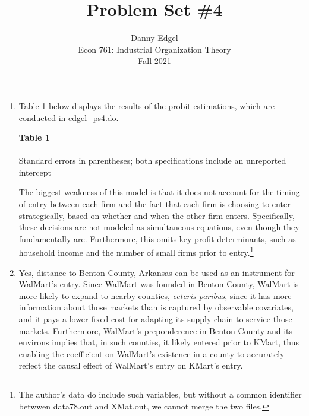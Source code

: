\documentclass{article}
\begin{document}
\title{	Problem Set \#4 }
\author{ 	Danny Edgel 					        	      \\ 
			Econ 761: Industrial Organization Theory	\\
			Fall 2021						                      \\
		}
\maketitle\thispagestyle{empty}



\begin{enumerate}
    \item Table 1 below displays the results of the probit estimations, which are conducted in edgel\_ps4.do.
        \begin{center}
            \textbf{Table 1} \\ \medskip
             \\ \smallskip
            \footnotesize{Standard errors in parentheses; both specifications include an unreported intercept}
        \end{center}
    The biggest weakness of this model is that it does not account for the timing of entry between each firm and the fact that each firm is choosing to enter strategically, based on whether and when the other firm enters. Specifically, these decisions are not modeled as simultaneous equations, even though they fundamentally are. Furthermore, this omits key profit determinants, such as household income and the number of small firms prior to entry.\footnote{The author's data do include such variables, but without a common identifier betwwen data78.out and XMat.out, we cannot merge the two files.}

    \item Yes, distance to Benton County, Arkansas can be used as an instrument for WalMart's entry. Since WalMart was founded in Benton County, WalMart is more likely to expand to nearby counties, \textit{ceteris paribus}, since it has more information about those markets than is captured by observable covariates, and it pays a lower fixed cost for adapting its supply chain to service those markets. Furthermore, WalMart's preponderence in Benton County and its environs implies that, in such counties, it likely entered prior to KMart, thus enabling the coefficient on WalMart's existence in a county to accurately reflect the causal effect of WalMart's entry on KMart's entry. %
    

\end{enumerate}
\end{document}
